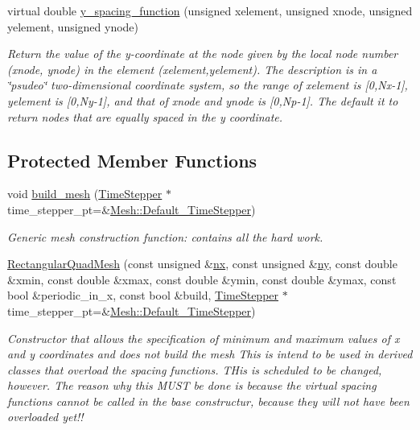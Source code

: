 \begin{DoxyCompactItemize}
virtual double \hyperlink{classoomph_1_1RectangularQuadMesh_ae78204de1f176cdf2e819673bd34e78a}{y\+\_\+spacing\+\_\+function} (unsigned xelement, unsigned xnode, unsigned yelement, unsigned ynode)
\begin{DoxyCompactList}\small\item\em Return the value of the y-\/coordinate at the node given by the local node number (xnode, ynode) in the element (xelement,yelement). The description is in a \char`\"{}psudeo\char`\"{} two-\/dimensional coordinate system, so the range of xelement is \mbox{[}0,Nx-\/1\mbox{]}, yelement is \mbox{[}0,Ny-\/1\mbox{]}, and that of xnode and ynode is \mbox{[}0,Np-\/1\mbox{]}. The default it to return nodes that are equally spaced in the y coordinate. \end{DoxyCompactList}\end{DoxyCompactItemize}
\subsection*{Protected Member Functions}
\begin{DoxyCompactItemize}
\item 
void \hyperlink{classoomph_1_1RectangularQuadMesh_afa579b413a2d8120e8228d840cb3582c}{build\+\_\+mesh} (\hyperlink{classoomph_1_1TimeStepper}{Time\+Stepper} $\ast$time\+\_\+stepper\+\_\+pt=\&\hyperlink{classoomph_1_1Mesh_a12243d0fee2b1fcee729ee5a4777ea10}{Mesh\+::\+Default\+\_\+\+Time\+Stepper})
\begin{DoxyCompactList}\small\item\em Generic mesh construction function\+: contains all the hard work. \end{DoxyCompactList}\item 
\hyperlink{classoomph_1_1RectangularQuadMesh_aeda49fb3896e9e3aec328391b196a6bf}{Rectangular\+Quad\+Mesh} (const unsigned \&\hyperlink{classoomph_1_1RectangularQuadMesh_abfef93d6322886cdce14a437186e4821}{nx}, const unsigned \&\hyperlink{classoomph_1_1RectangularQuadMesh_a86d76a55eb7c4e8bca9b74d23c8b0412}{ny}, const double \&xmin, const double \&xmax, const double \&ymin, const double \&ymax, const bool \&periodic\+\_\+in\+\_\+x, const bool \&build, \hyperlink{classoomph_1_1TimeStepper}{Time\+Stepper} $\ast$time\+\_\+stepper\+\_\+pt=\&\hyperlink{classoomph_1_1Mesh_a12243d0fee2b1fcee729ee5a4777ea10}{Mesh\+::\+Default\+\_\+\+Time\+Stepper})
\begin{DoxyCompactList}\small\item\em Constructor that allows the specification of minimum and maximum values of x and y coordinates and does not build the mesh This is intend to be used in derived classes that overload the spacing functions. T\+His is scheduled to be changed, however. The reason why this M\+U\+ST be done is because the virtual spacing functions cannot be called in the base constructur, because they will not have been overloaded yet!! \end{DoxyCompactList}\end{DoxyCompactItemize}
